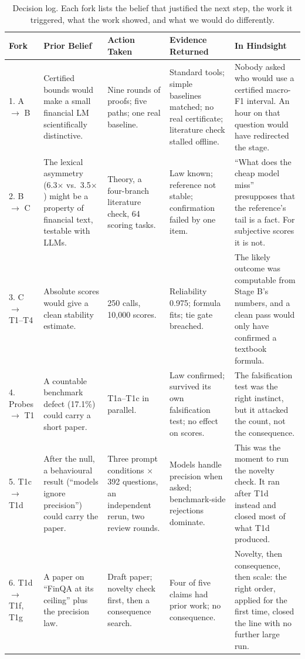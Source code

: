 \documentclass[11pt]{article}
\begin{document}
\begin{table}[!t]
\centering
\scriptsize
\renewcommand{\arraystretch}{1.18}
\begin{tabularx}{\textwidth}{@{}L{1.55cm}YYYY@{}}
\toprule
\textbf{Fork} & \textbf{Prior Belief} & \textbf{Action Taken} & \textbf{Evidence Returned} & \textbf{In Hindsight} \\
. A $\to$ B & Certified bounds would make a small financial LM scientifically distinctive. & Nine rounds of proofs; five paths; one real baseline. & Standard tools; simple baselines matched; no real certificate; literature check stalled offline. & Nobody asked who would use a certified macro-F1 interval. An hour on that question would have redirected the stage. \\
2. B $\to$ C & The lexical asymmetry (6.3$\times$ vs.\ 3.5$\times$) might be a property of financial text, testable with LLMs. & Theory, a four-branch literature check, 64 scoring tasks. & Law known; reference not stable; confirmation failed by one item. & ``What does the cheap model miss'' presupposes that the reference's tail is a fact. For subjective scores it is not. \\
3. C $\to$ T1--T4 & Absolute scores would give a clean stability estimate. & 250 calls, 10,000 scores. & Reliability 0.975; formula fits; tie gate breached. & The likely outcome was computable from Stage B's numbers, and a clean pass would only have confirmed a textbook formula. \\
4. Probes $\to$ T1 & A countable benchmark defect (17.1\%) could carry a short paper. & T1a--T1c in parallel. & Law confirmed; survived its own falsification test; no effect on scores. & The falsification test was the right instinct, but it attacked the count, not the consequence. \\
5. T1c $\to$ T1d & After the null, a behavioural result (``models ignore precision'') could carry the paper. & Three prompt conditions $\times$ 392 questions, an independent rerun, two review rounds. & Models handle precision when asked; benchmark-side rejections dominate. & This was the moment to run the novelty check. It ran after T1d instead and closed most of what T1d produced. \\
6. T1d $\to$ T1f, T1g & A paper on ``FinQA at its ceiling'' plus the precision law. & Draft paper; novelty check first, then a consequence search. & Four of five claims had prior work; no consequence. & Novelty, then consequence, then scale: the right order, applied for the first time, closed the line with no further large run. \\
\bottomrule
\end{tabularx}
\caption{Decision log. Each fork lists the belief that justified the next step, the work it triggered, what the work showed, and what we would do differently.}
\label{tab:decisions}
\end{table}
\end{document}
